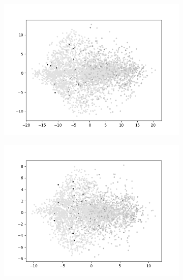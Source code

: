 \begin{figure}[H]
    \centering
    \begin{subfigure}{.25\textwidth}
        \centering
        \includegraphics[width=\textwidth]{images/figures/experiments_latent/convolutional_dim1024_PCA_dsm.png}
    \end{subfigure}%
    \begin{subfigure}{.25\textwidth}
        \centering
        \includegraphics[width=\textwidth]{images/figures/experiments_latent/convolutional_dim512_PCA_dsm.png}
    \end{subfigure}%
    \begin{subfigure}{.25\textwidth}
        \centering

\end{subfigure}
\end{figure}

